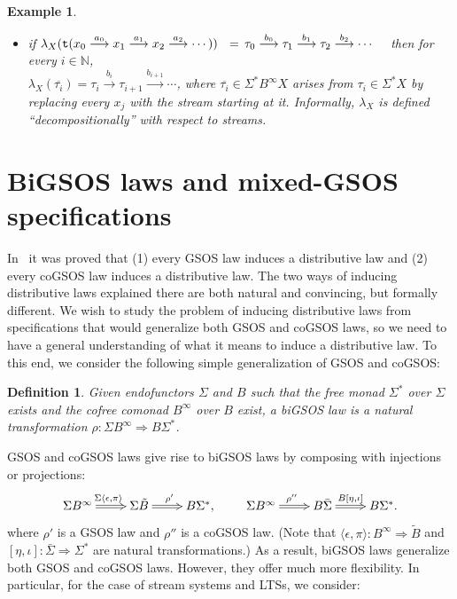 \documentclass[adraft,copyright,creativecommons]{eptcs}
\newtheorem{definition}[theorem]{Definition}
\newtheorem{example}[theorem]{Example}
\newcommand{\To}{\Longrightarrow}
\newcommand{\Bid}{\tilde{B}}
\newcommand{\Bb}{B^{\infty}}
\newcommand{\Sid}{\bar{\S}}
\newcommand{\Ss}{\Sigma^*}
\renewcommand{\S}{\Sigma}
\newcommand{\goes}[1]{\stackrel{#1}{\longrightarrow}}
\begin{document}
\begin{example}
\begin{itemize}
Informally, $\lambda$ is defined compositionally with respect to $\S$-terms.
\item[(iv)] if $\lambda_X({\tt t}(x_0 \goes{a_0} x_1 \goes{a_1} x_2 \goes{a_2} \cdots)) \quad\!\! = \, \tau_0\goes{b_0}\tau_1\goes{b_1}\tau_2\goes{b_2}\cdots\quad$ then for every $i\in\mathbb{N}$, \\
$\lambda_X(\overline{\tau_i}) = \tau_i\goes{b_i}\tau_{i+1}\goes{b_{i+1}} \cdots$, where $\overline{\tau_i}\in\Ss\Bb X$ arises from $\tau_i\in\Ss X$ by replacing every $x_j$ with the stream starting at it. Informally, $\lambda_X$ is defined ``decompositionally'' with respect to streams.
\end{itemize}

\end{example}

\section{BiGSOS laws and mixed-GSOS specifications}

In~\cite{turiplotkin} it was proved that (1) every GSOS law induces a distributive law and (2) every coGSOS law induces a distributive law. The two ways of inducing distributive laws explained there are both natural and convincing, but formally different. We wish to study the problem of inducing distributive laws from specifications that would generalize both GSOS and coGSOS laws, so we need to have a general understanding of what it means to induce a distributive law. To this end, we consider the following simple generalization of GSOS and coGSOS:

\begin{definition}\label{def:bigsos}\rm
Given endofunctors $\S$ and $B$ such that the free monad $\Ss$ over $\S$ exists and the cofree comonad $\Bb$ over $B$ exist, a {\em biGSOS law} is a natural transformation $\rho:\S\Bb\To B\Ss$.
\end{definition}

GSOS and coGSOS laws give rise to biGSOS laws by composing with injections or projections:
\[
\xymatrix{
	\S\Bb\ar@{=>}[r]^{\S\langle{\epsilon,\pi}\rangle} & \S\Bid\ar@{=>}[r]^{\rho'} & B\Ss,
} \qquad
\xymatrix{
    \S\Bb\ar@{=>}[r]^{\rho''} & B\Sid\ar@{=>}[r]^-{B[\eta,\iota]} & B\Ss.
}
\]
where $\rho'$ is a GSOS law and $\rho''$ is a coGSOS law.
(Note that $\langle\epsilon,\pi\rangle:\Bb\To\Bid$ and $[\eta,\iota]:\Sid\To\Ss$ are natural transformations.)
As a result, biGSOS laws generalize both GSOS and coGSOS laws. However, they offer much more flexibility. In particular, for the case of stream systems and LTSs, we consider:
\end{document}
